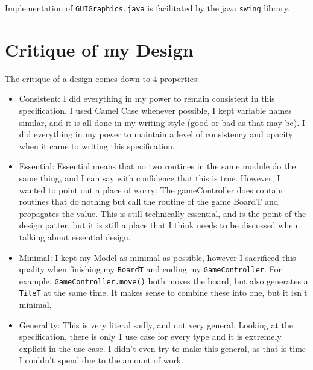 \documentclass[12pt]{article}
\begin{document}
Implementation of \texttt{GUIGraphics.java} is facilitated by the java \texttt{swing} library.

\newpage

\section* {Critique of my Design}

The critique of a design comes down to 4 properties:

\begin{itemize}
  \item Consistent: I did everything in my power to remain consistent in this specification. I used Camel Case whenever possible, I kept variable names similar, and it is all done in my writing style (good or bad as that may be). I did everything in my power to maintain a level of consistency and opacity when it came to writing this specification.
  \item Essential: Essential means that no two routines in the same module do the same thing, and I can say with confidence that this is true. However, I wanted to point out a place of worry: The gameController does contain routines that do nothing but call the routine of the game BoardT and propagates the value. This is still technically essential, and is the point of the design patter, but it is still a place that I think needs to be discussed when talking about essential design.
  \item Minimal: I kept my Model as minimal as possible, however I sacrificed this quality when finishing my \texttt{BoardT} and coding my \texttt{GameController}. For example, \texttt{GameController.move()} both moves the board, but also generates a \texttt{TileT} at the same time. It makes sense to combine these into one, but it isn't minimal.
  \item Generality: This is very literal sadly, and not very general. Looking at the specification, there is only 1 use case for every type and it is extremely explicit in the use case. I didn't even try to make this general, as that is time I couldn't spend due to the amount of work.
\end{itemize}
\end{document}
